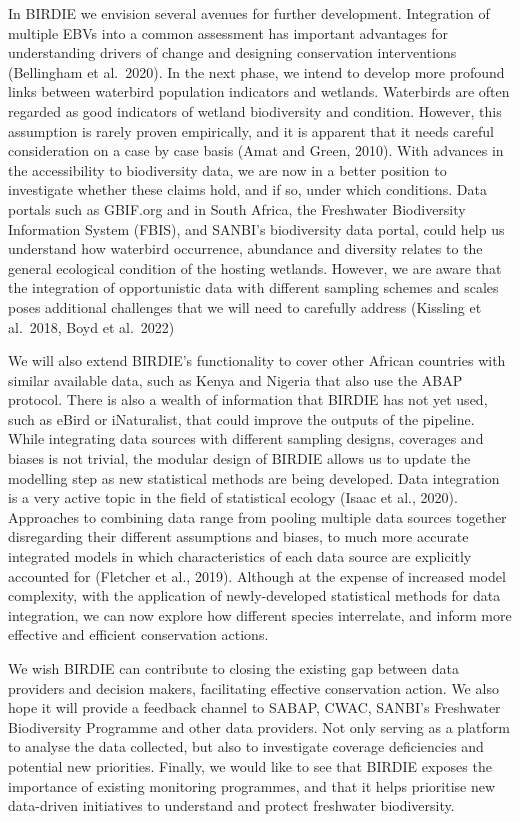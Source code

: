 \documentclass[utf8]{frontiersSCNS}
\begin{document}
In BIRDIE we envision several avenues for further development.
Integration of multiple EBVs into a common assessment has important
advantages for understanding drivers of change and designing
conservation interventions (Bellingham et al.~2020). In the next phase,
we intend to develop more profound links between waterbird population
indicators and wetlands. Waterbirds are often regarded as good
indicators of wetland biodiversity and condition. However, this
assumption is rarely proven empirically, and it is apparent that it
needs careful consideration on a case by case basis (Amat and Green,
2010). With advances in the accessibility to biodiversity data, we are
now in a better position to investigate whether these claims hold, and
if so, under which conditions. Data portals such as GBIF.org and in
South Africa, the Freshwater Biodiversity Information System (FBIS), and
SANBI's biodiversity data portal, could help us understand how waterbird
occurrence, abundance and diversity relates to the general ecological
condition of the hosting wetlands. However, we are aware that the
integration of opportunistic data with different sampling schemes and
scales poses additional challenges that we will need to carefully
address (Kissling et al.~2018, Boyd et al.~2022)

We will also extend BIRDIE's functionality to cover other African
countries with similar available data, such as Kenya and Nigeria that
also use the ABAP protocol. There is also a wealth of information that
BIRDIE has not yet used, such as eBird or iNaturalist, that could
improve the outputs of the pipeline. While integrating data sources with
different sampling designs, coverages and biases is not trivial, the
modular design of BIRDIE allows us to update the modelling step as new
statistical methods are being developed. Data integration is a very
active topic in the field of statistical ecology (Isaac et al., 2020).
Approaches to combining data range from pooling multiple data sources
together disregarding their different assumptions and biases, to much
more accurate integrated models in which characteristics of each data
source are explicitly accounted for (Fletcher et al., 2019). Although at
the expense of increased model complexity, with the application of
newly-developed statistical methods for data integration, we can now
explore how different species interrelate, and inform more effective and
efficient conservation actions.

We wish BIRDIE can contribute to closing the existing gap between data
providers and decision makers, facilitating effective conservation
action. We also hope it will provide a feedback channel to SABAP, CWAC,
SANBI's Freshwater Biodiversity Programme and other data providers. Not
only serving as a platform to analyse the data collected, but also to
investigate coverage deficiencies and potential new priorities. Finally,
we would like to see that BIRDIE exposes the importance of existing
monitoring programmes, and that it helps prioritise new data-driven
initiatives to understand and protect freshwater biodiversity.
\end{document}
